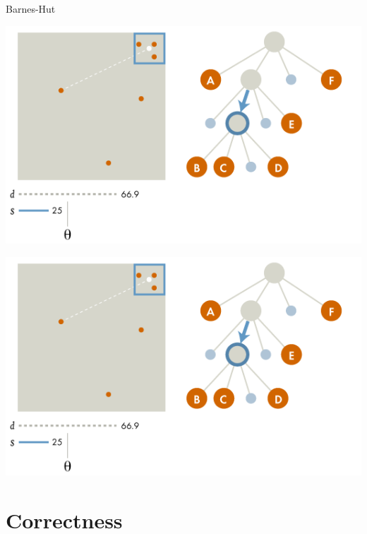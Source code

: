 \documentclass{beamer}
\begin{document}
\begin{frame}[allowframebreaks]{Barnes-Hut}
\framebreak

\includegraphics[width=\textwidth]{quadtree_internal}

\framebreak

\includegraphics[width=\textwidth]{quadtree_internal}

\end{frame}

\section{Correctness}
\end{document}

